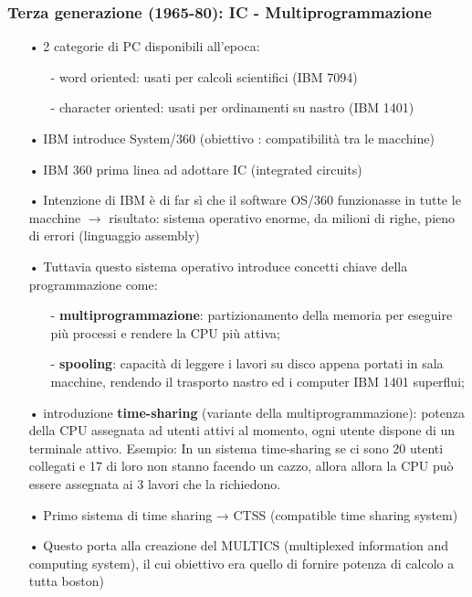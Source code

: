 \documentclass{article}
\begin{document}
\subsubsection{Terza generazione (1965-80): IC - Multiprogrammazione}
\begin{enumerate}
   \item[•] 2 categorie di PC disponibili all'epoca:
      \begin{enumerate}
         \item[-] word oriented: usati per calcoli scientifici (IBM 7094)
         \item[-] character oriented: usati per ordinamenti su nastro (IBM 1401)
      \end{enumerate}
   \item[•] IBM introduce System/360 (obiettivo : compatibilità tra le macchine)
   \item[•] IBM 360 prima linea ad adottare IC (integrated circuits) 
   \item[•] Intenzione di IBM è di far sì che il software OS/360 funzionasse in tutte le macchine $\rightarrow$
            risultato: sistema operativo enorme, da milioni di righe, pieno di errori (linguaggio assembly) 
   \item[•] Tuttavia questo sistema operativo introduce concetti chiave della programmazione come:
      \begin{enumerate}
         \item[-] \textbf{multiprogrammazione}: partizionamento della memoria per eseguire più processi e rendere la CPU più attiva;
         \item[-] \textbf{spooling}: capacità di leggere i lavori su disco appena portati in sala macchine, rendendo il trasporto nastro ed i computer IBM 1401 superflui;
      \end{enumerate}
   \item[•] introduzione \textbf{time-sharing} (variante della multiprogrammazione): potenza della CPU assegnata ad utenti attivi al momento, ogni utente dispone di un terminale attivo. Esempio: In un sistema time-sharing
            se ci sono 20 utenti collegati e 17 di loro non stanno facendo un cazzo, allora allora la CPU può essere assegnata ai 3 lavori che la richiedono. 
   \item[•] Primo sistema di time sharing → CTSS (compatible time sharing system)
   \item[•] Questo porta alla creazione del MULTICS (multiplexed information and computing system), il cui obiettivo era quello di fornire potenza di calcolo a tutta boston)

\end{enumerate}
\end{document}

